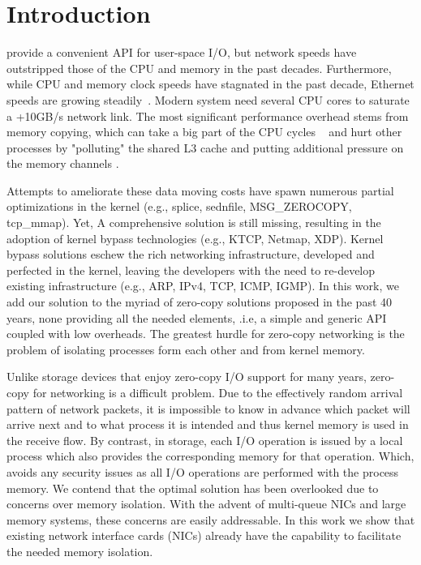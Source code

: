 \section{Introduction}
\sockets provide a convenient API for user-space I/O,  but network speeds have outstripped those of the CPU and memory in the past decades. Furthermore, while CPU and memory clock speeds have stagnated in the past decade, Ethernet speeds are growing steadily~\cite{roadmap}. Modern system need several CPU cores to saturate a +10GB/s network link. The most significant performance overhead stems from memory copying, which can take a big part of the CPU cycles ~\cite{desendmsg} and hurt other processes by "polluting" the shared L3 cache and putting additional pressure on the memory channels \cite{markuze2016true}. 

Attempts to ameliorate these data moving costs have spawn numerous partial optimizations in the kernel (e.g., splice, sednfile, MSG\_ZEROCOPY, tcp\_mmap). Yet, A comprehensive solution is still missing, resulting in the adoption of kernel bypass technologies (e.g., KTCP, Netmap, XDP). Kernel bypass solutions eschew the rich networking infrastructure, developed and perfected in the kernel, leaving the developers with the need to re-develop existing infrastructure (e.g., ARP, IPv4, TCP, ICMP, IGMP). In this work, we add our solution to the myriad of zero-copy solutions proposed in the past 40 years, none providing all the needed elements, .i.e, a simple and generic API coupled with low overheads. The greatest hurdle for zero-copy networking is the problem of isolating processes form each other and from kernel memory. 

Unlike storage devices that enjoy zero-copy I/O support for many years, zero-copy for networking is a difficult problem. Due to the effectively random arrival pattern of network packets, it is impossible to know in advance which packet will arrive next and to what process it is intended and thus kernel memory is used in the receive flow. By contrast, in storage, each I/O operation is issued by a local process which also provides the corresponding memory for that operation. Which, avoids any security issues as all I/O operations are performed with the process memory.
We contend that the optimal solution has been overlooked due to concerns over memory isolation. With the advent of multi-queue NICs and large memory systems, these concerns are easily addressable. In this work we show that existing network interface cards (NICs) already have the capability to facilitate the needed memory isolation.

